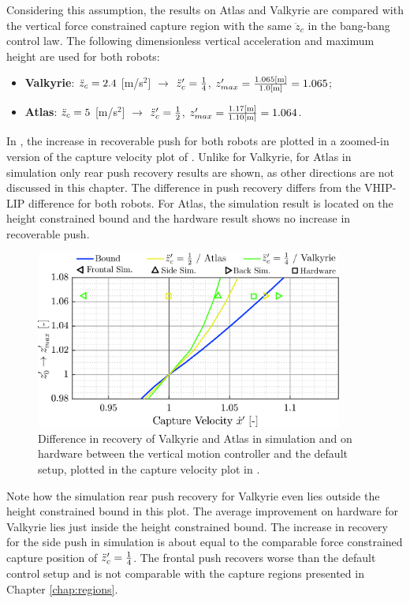 Considering this assumption, the results on Atlas and Valkyrie are compared with the vertical force constrained capture region with the same $\ddot{z}_c$ in the bang-bang control law. The following dimensionless vertical acceleration and maximum height are used for both robots:
\begin{itemize}
	\item \textbf{Valkyrie}: $\ddot{z}_{c}=2.4$ [m/s$^2$] $\rightarrow$ $\ddot{z}_{c}'=\frac{1}{4}$, \quad $z_{max}' = \frac{1.065\text{[m]}}{1.0\text{[m]}}=1.065$;
	\item \textbf{Atlas}: $\ddot{z}_{c}=5$ [m/s$^2$] $\rightarrow$ $\ddot{z}_{c}'=\frac{1}{2}$, \quad $z_{max}' = \frac{1.17\text{[m]}}{1.10\text{[m]}}=1.064$.
\end{itemize}
In , the increase in recoverable push for both robots are plotted in a zoomed-in version of the capture velocity plot of . Unlike for Valkyrie, for Atlas in simulation only rear push recovery results are shown, as other directions are not discussed in this chapter. The difference in push recovery differs from the \ac{VHIP}-\ac{LIP} difference for both robots. For Atlas, the simulation result is located on the height constrained bound and the hardware result shows no increase in recoverable push.
\begin{figure}
\centering
\includegraphics[width=0.9\textwidth]{STYLESTUFF/regioncomparison1.png}
\caption{Difference in recovery of Valkyrie and Atlas in simulation and on hardware between the vertical motion controller and the default setup, plotted in the capture velocity plot in .}
\label{fig:regioncomparison}
\end{figure}

Note how the simulation rear push recovery for Valkyrie even lies outside the height constrained bound in this plot. The average improvement on hardware for Valkyrie lies just inside the height constrained bound. The increase in recovery for the side push in simulation is about equal to the comparable force constrained capture position of $\ddot{z}_{c}'=\frac{1}{4}$. The frontal push recovers worse than the default control setup and is not comparable with the capture regions presented in Chapter \ref{chap:regions}.

